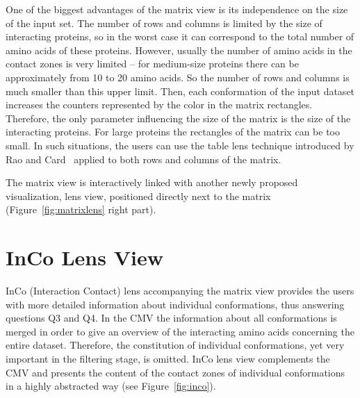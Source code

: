 \documentclass[journal]{vgtc}                %
\begin{document}
One of the biggest advantages of the matrix view is its independence on the size of the input set.
The number of rows and columns is limited by the size of interacting proteins, so in the worst case it can correspond to the total number of amino acids of these proteins.
However, usually the number of amino acids in the contact zones is very limited -- for medium-size proteins there can be approximately from 10 to 20 amino acids.
So the number of rows and columns is much smaller than this upper limit.
Then, each conformation of the input dataset increases the counters represented by the color in the matrix rectangles.
Therefore, the only parameter influencing the size of the matrix is the size of the interacting proteins.
For large proteins the rectangles of the matrix can be too small.
In such situations, the users can use the table lens technique introduced by Rao and Card~\cite{Rao1994} applied to both rows and columns of the matrix.

The matrix view is interactively linked with another newly proposed visualization, lens view, positioned directly next to the matrix (Figure~\ref{fig:matrixlens} right part). 

\section{InCo Lens View}
InCo (Interaction Contact) lens accompanying the matrix view provides the users with more detailed information about individual conformations, thus answering questions Q3 and Q4.
In the CMV the information about all conformations is merged in order to give an overview of the interacting amino acids concerning the entire dataset.
Therefore, the constitution of individual conformations, yet very important in the filtering stage, is omitted.
InCo lens view complements the CMV and presents the content of the contact zones of individual conformations in a highly abstracted way (see Figure~\ref{fig:inco}).
\end{document}
